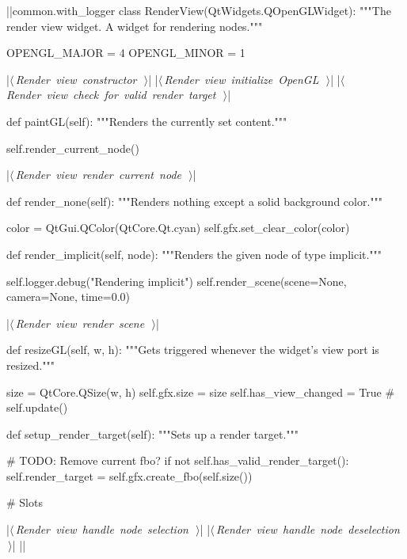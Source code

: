 \documentclass[%
    a4paper,    %
    justified,  %
    nobib,      %
    openany     %
]{tufte-book}
\begin{document}
\begin{fullwidth}
\begin{flushleft}
\begin{minipage}{\linewidth}
\begin{pythoncode}
|\normalfont{}\fontfamily{}|common.with_logger
class RenderView(QtWidgets.QOpenGLWidget):
    """The render view widget. A widget for rendering nodes."""

    OPENGL_MAJOR        = 4
    OPENGL_MINOR        = 1


    |\hbox{$\langle\,${\itshape Render view constructor}\nobreak\ {\footnotesize {}}$\,\rangle$}|
    |\hbox{$\langle\,${\itshape Render view initialize OpenGL}\nobreak\ {\footnotesize {}}$\,\rangle$}|
    |\hbox{$\langle\,${\itshape Render view check for valid render target}\nobreak\ {\footnotesize {}}$\,\rangle$}|

    def paintGL(self):
        """Renders the currently set content."""

        self.render_current_node()

    |\hbox{$\langle\,${\itshape Render view render current node}\nobreak\ {\footnotesize {}}$\,\rangle$}|

    def render_none(self):
        """Renders nothing except a solid background color."""

        color = QtGui.QColor(QtCore.Qt.cyan)
        self.gfx.set_clear_color(color)

    def render_implicit(self, node):
        """Renders the given node of type implicit."""

        self.logger.debug("Rendering implicit")
        self.render_scene(scene=None, camera=None, time=0.0)

    |\hbox{$\langle\,${\itshape Render view render scene}\nobreak\ {\footnotesize {}}$\,\rangle$}|

    def resizeGL(self, w, h):
        """Gets triggered whenever the widget's view port is resized."""

        size = QtCore.QSize(w, h)
        self.gfx.size = size
        self.has_view_changed = True
        # self.update()

    def setup_render_target(self):
        """Sets up a render target."""

        # TODO: Remove current fbo?
        if not self.has_valid_render_target():
            self.render_target = self.gfx.create_fbo(self.size())

    # Slots

    |\hbox{$\langle\,${\itshape Render view handle node selection}\nobreak\ {\footnotesize {}}$\,\rangle$}|
    |\hbox{$\langle\,${\itshape Render view handle node deselection}\nobreak\ {\footnotesize {}}$\,\rangle$}|
|\NWsep|
\end{pythoncode}
\vspace{1.5ex}
\footnotesize
\begin{list}{}{\setlength{\itemsep}{-\parsep}\setlength{\itemindent}{-\leftmargin}}


\end{list}
\end{minipage}
\end{flushleft}
\end{fullwidth}
\end{document}
